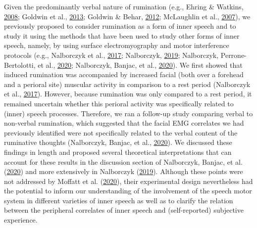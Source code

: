 \documentclass[
  english,
  man, donotrepeattitle,floatsintext]{apa6}
\begin{document}
Given the predominantly verbal nature of rumination (e.g., Ehring \& Watkins, \protect\hyperlink{ref-ehring_repetitive_2008}{2008}; Goldwin et al., \protect\hyperlink{ref-goldwin_concreteness_2013}{2013}; Goldwin \& Behar, \protect\hyperlink{ref-goldwin_concreteness_2012}{2012}; McLaughlin et al., \protect\hyperlink{ref-mclaughlin_effects_2007}{2007}), we previously proposed to consider rumination as a form of inner speech and to study it using the methods that have been used to study other forms of inner speech, namely, by using surface electromyography and motor interference protocols (e.g., Nalborczyk et al., \protect\hyperlink{ref-nalborczyk_orofacial_2017}{2017}; Nalborczyk, \protect\hyperlink{ref-nalborczyk_understanding_2019}{2019}; Nalborczyk, Perrone-Bertolotti, et al., \protect\hyperlink{ref-nalborczyk_articulatory_2020}{2020}; Nalborczyk, Banjac, et al., \protect\hyperlink{ref-nalborczyk_dissociating_2020}{2020}). We first showed that induced rumination was accompanied by increased facial (both over a forehead and a perioral site) muscular activity in comparison to a rest period (Nalborczyk et al., \protect\hyperlink{ref-nalborczyk_orofacial_2017}{2017}). However, because rumination was only compared to a rest period, it remained uncertain whether this perioral activity was specifically related to (inner) speech processes. Therefore, we ran a follow-up study comparing verbal to non-verbal rumination, which suggested that the facial EMG correlates we had previously identified were not specifically related to the verbal content of the ruminative thoughts (Nalborczyk, Banjac, et al., \protect\hyperlink{ref-nalborczyk_dissociating_2020}{2020}). We discussed these findings in length and proposed several theoretical interpretations that can account for these results in the discussion section of Nalborczyk, Banjac, et al. (\protect\hyperlink{ref-nalborczyk_dissociating_2020}{2020}) and more extensively in Nalborczyk (\protect\hyperlink{ref-nalborczyk_understanding_2019}{2019}). Although these points were not addressed by Moffatt et al. (\protect\hyperlink{ref-moffatt_inner_2020}{2020}), their experimental design nevertheless had the potential to inform our understanding of the involvement of the speech motor system in different varieties of inner speech as well as to clarify the relation between the peripheral correlates of inner speech and (self-reported) subjective experience.
\end{document}

